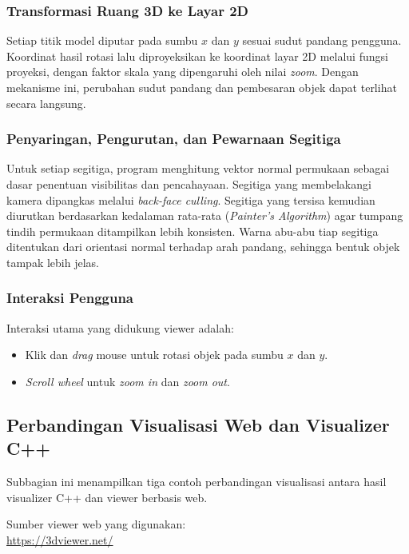 \documentclass{article}
\begin{document}
\subsubsection{Transformasi Ruang 3D ke Layar 2D}

Setiap titik model diputar pada sumbu $x$ dan $y$ sesuai sudut pandang pengguna.
Koordinat hasil rotasi lalu diproyeksikan ke koordinat layar 2D melalui fungsi proyeksi,
dengan faktor skala yang dipengaruhi oleh nilai \textit{zoom}. Dengan mekanisme ini,
perubahan sudut pandang dan pembesaran objek dapat terlihat secara langsung.

\subsubsection{Penyaringan, Pengurutan, dan Pewarnaan Segitiga}

Untuk setiap segitiga, program menghitung vektor normal permukaan sebagai dasar
penentuan visibilitas dan pencahayaan. Segitiga yang membelakangi kamera dipangkas
melalui \textit{back-face culling}. Segitiga yang tersisa kemudian diurutkan berdasarkan
kedalaman rata-rata (\textit{Painter's Algorithm}) agar tumpang tindih permukaan
ditampilkan lebih konsisten. Warna abu-abu tiap segitiga ditentukan dari orientasi normal
terhadap arah pandang, sehingga bentuk objek tampak lebih jelas.

\subsubsection{Interaksi Pengguna}

Interaksi utama yang didukung viewer adalah:

\begin{itemize}
    \item Klik dan \textit{drag} mouse untuk rotasi objek pada sumbu $x$ dan $y$.
    \item \textit{Scroll wheel} untuk \textit{zoom in} dan \textit{zoom out}.
\end{itemize}

\subsection{Perbandingan Visualisasi Web dan Visualizer C++}

Subbagian ini menampilkan tiga contoh perbandingan visualisasi antara hasil visualizer C++
dan viewer berbasis web.

Sumber viewer web yang digunakan:\\
\url{https://3dviewer.net/}
\end{document}
